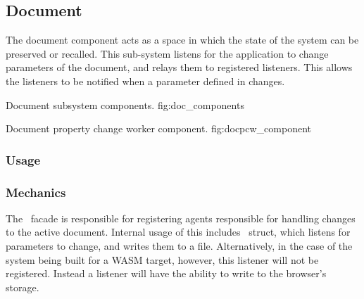 \newcommand{\docarea}[3]{
    \index{#1}\pbodyitem{#2}{#3}
}

\newcommand{\extparamref}[3]{
    \index{#1}\pbodyitem{#2}{#3}
}

\subsection{Document}
The document component acts as a space in which the state of the system can be preserved or recalled.
This sub-system listens for the application to change parameters of the document, and relays them to registered listeners.
This allows the listeners to be notified when a parameter defined in  changes.

{Document subsystem components.}
{fig:doc_components}

{Document property change worker component.}
{fig:docpcw_component}


\subsubsection{Usage}


\subsubsection{Mechanics}
The \dmod\ facade is responsible for registering agents responsible for handling changes to the active document.
Internal usage of this includes \dffspcstype\ struct, which listens for parameters to change, and writes them to a file.
Alternatively, in the case of the system being built for a WASM target, however, this listener will not be registered.
Instead a \dflspcstype{} listener will have the ability to write to the browser's storage.
